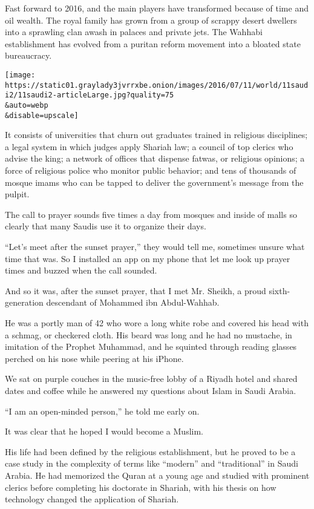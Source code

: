 Fast forward to 2016, and the main players have transformed because of
time and oil wealth. The royal family has grown from a group of scrappy
desert dwellers into a sprawling clan awash in palaces and private jets.
The Wahhabi establishment has evolved from a puritan reform movement
into a bloated state bureaucracy.

\texttt{[image: https://static01.graylady3jvrrxbe.onion/images/2016/07/11/world/11saudi2/11saudi2-articleLarge.jpg?quality=75\\\&auto=webp\\\&disable=upscale]}

It consists of universities that churn out graduates trained in
religious disciplines; a legal system in which judges apply Shariah law;
a council of top clerics who advise the king; a network of offices that
dispense fatwas, or religious opinions; a force of religious police who
monitor public behavior; and tens of thousands of mosque imams who can
be tapped to deliver the government's message from the pulpit.

The call to prayer sounds five times a day from mosques and inside of
malls so clearly that many Saudis use it to organize their days.

``Let's meet after the sunset prayer,'' they would tell me, sometimes
unsure what time that was. So I installed an app on my phone that let me
look up prayer times and buzzed when the call sounded.

And so it was, after the sunset prayer, that I met Mr. Sheikh, a proud
sixth-generation descendant of Mohammed ibn Abdul-Wahhab.

He was a portly man of 42 who wore a long white robe and covered his
head with a schmag, or checkered cloth. His beard was long and he had no
mustache, in imitation of the Prophet Muhammad, and he squinted through
reading glasses perched on his nose while peering at his iPhone.

We sat on purple couches in the music-free lobby of a Riyadh hotel and
shared dates and coffee while he answered my questions about Islam in
Saudi Arabia.

``I am an open-minded person,'' he told me early on.

It was clear that he hoped I would become a Muslim.

His life had been defined by the religious establishment, but he proved
to be a case study in the complexity of terms like ``modern'' and
``traditional'' in Saudi Arabia. He had memorized the Quran at a young
age and studied with prominent clerics before completing his doctorate
in Shariah, with his thesis on how technology changed the application of
Shariah.

